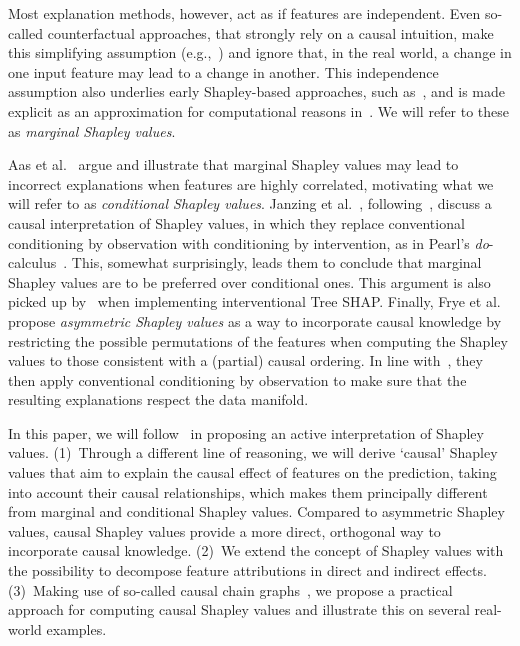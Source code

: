 \documentclass{article}
\begin{document}
Most explanation methods, however, act as if features are independent. Even so-called counterfactual approaches, that strongly rely on a causal intuition, make this simplifying assumption (e.g.,~\cite{wachter2017counterfactual}) and ignore that, in the real world, a change in one input feature may lead to a change in another. This independence assumption also underlies early Shapley-based approaches, such as~\cite{vstrumbelj2014explaining,datta2016algorithmic}, and is made explicit as an approximation for computational reasons in~\cite{lundberg2017unified}. We will refer to these as {\em marginal Shapley values}.

Aas et al.~\cite{aas2019explaining} argue and illustrate that marginal Shapley values may lead to incorrect explanations when features are highly correlated, motivating what we will refer to as {\em conditional Shapley values}. Janzing et al.~\cite{janzing2019feature}, following~\cite{datta2016algorithmic}, discuss a causal interpretation of Shapley values, in which they replace conventional conditioning by observation with conditioning by intervention, as in Pearl's {\em do}-calculus~\cite{pearl2012calculus}. This, somewhat surprisingly, leads them to conclude that marginal Shapley values are to be preferred over conditional ones. This argument is also picked up by~\cite{lundberg2020local} when implementing interventional Tree SHAP. Finally, Frye et al.~\cite{frye2019asymmetric} propose {\em asymmetric Shapley values} as a way to incorporate causal knowledge by restricting the possible permutations of the features when computing the Shapley values to those consistent with a (partial) causal ordering. In line with~\cite{aas2019explaining}, they then apply conventional conditioning by observation to make sure that the resulting explanations respect the data manifold.

In this paper, we will follow~\cite{datta2016algorithmic,	janzing2019feature,lundberg2020local} in proposing an active interpretation of Shapley values. (1)~Through a different line of reasoning, we will derive `causal' Shapley values that aim to explain the causal effect of features on the prediction, taking into account their causal relationships, which makes them principally different from marginal and conditional Shapley values. Compared to asymmetric Shapley values, causal Shapley values provide a more direct, orthogonal way to incorporate causal knowledge. (2)~We extend the concept of Shapley values with the possibility to decompose feature attributions in direct and indirect effects. (3)~Making use of so-called causal chain graphs~\cite{lauritzen2002chain}, we propose a practical approach for computing causal Shapley values and illustrate this on several real-world examples.
\end{document}
